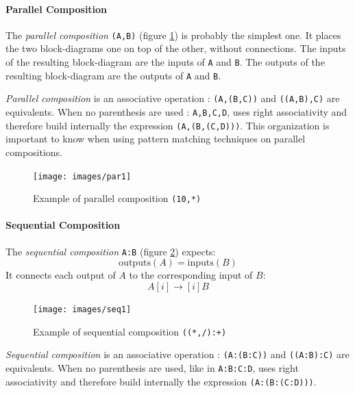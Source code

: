 \documentclass[a4paper,10pt]{book}
\begin{document}
\paragraph{Parallel Composition}
The \emph{parallel composition}  \lstinline'(A,B)' (figure \ref{figure:par1}) is probably the simplest one. It places the two block-dia\-grams one on top of the other, without connections. The inputs of the resulting block-diagram are the inputs of \lstinline$A$ and \lstinline$B$. The outputs of the resulting block-diagram are the outputs of \lstinline$A$ and \lstinline$B$. 

\emph{Parallel composition} is an associative operation : \lstinline$(A,(B,C))$ and \lstinline$((A,B),C)$ are equivalents. When no parenthesis are used : \lstinline'A,B,C,D', \faust uses right associativity and therefore build internally the expression \lstinline$(A,(B,(C,D)))$. This organization is important to know when using pattern matching techniques on parallel compositions. 

\begin{figure}[h]
\centering
\texttt{[image: images/par1]}
\caption{Example of parallel composition  \lstinline'(10,*)'}
\label{figure:par1}
\end{figure}


\paragraph{Sequential Composition}
The \emph{sequential composition}  \lstinline$A:B$ (figure \ref{figure:seq1}) expects:
\begin{equation}
\mathrm{outputs}(A)=\mathrm{inputs}(B)
\end{equation}  
It connects each output of  $A$ to the corresponding input of $B$: 
\begin{equation}
A[i]\rightarrow[i]B
\end{equation}  

\begin{figure}[h]
\centering 
\texttt{[image: images/seq1]}
\caption{Example of sequential composition  \lstinline'((*,/):+)' } 
\label{figure:seq1}
\end{figure}

\emph{Sequential composition} is an associative operation : \lstinline$(A:(B:C))$ and \lstinline$((A:B):C)$ are equivalents. When no parenthesis are used, like in \lstinline$A:B:C:D$, \faust uses right associativity and therefore build internally the expression \lstinline$(A:(B:(C:D)))$.
\end{document}
